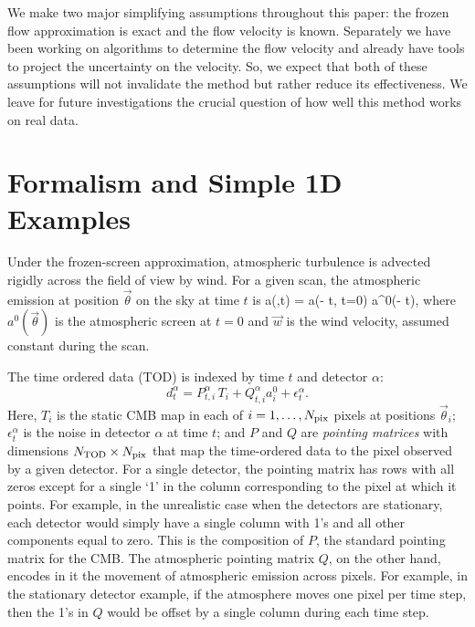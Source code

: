 We make two major simplifying assumptions throughout this paper: the frozen flow approximation is exact and the flow velocity is known. Separately we have been working on algorithms to determine the flow velocity and already have tools to project the uncertainty on the velocity. So, we expect that both of these assumptions will not invalidate the method but rather reduce its effectiveness. We leave for future investigations the crucial question of how well this method works on real data.



\section{Formalism and Simple 1D Examples}

Under the frozen-screen approximation, atmospheric turbulence is advected rigidly across the field of view by wind. For a given scan, the atmospheric emission at position $\vec\theta$ on the sky at time $t$ is \be
a(\vec\theta,t) = a(\vec\theta -  t, t=0) \equiv a^0(\vec\theta -  t),\ee 
where $a^0(\vec\theta)$ is the atmospheric screen at $t=0$ and $\vec{w}$ is the wind velocity, assumed constant during the scan. 

The time ordered data (TOD) is indexed by time $t$ and detector $\alpha$:
\begin{equation}
{d}^\alpha_{t} = P^{\alpha}_{t,i}\,T_i + Q^\alpha_{t,i} a^0_{i} + \epsilon^\alpha_{t}.
\end{equation}
Here, $T_i$ is the static CMB map in each of $i=1,\ldots, N_{\rm pix}$ pixels at positions $\vec\theta_i$; $\epsilon^\alpha_t$ is the noise in detector $\alpha$ at time $t$; and $P$ and $Q$ are {\it pointing matrices} with dimensions $N_{\rm TOD} \times N_{\rm pix}$ that map the time-ordered data to the pixel observed by a given detector. For a single detector, the pointing matrix has rows with all zeros except for a single `1' in the column corresponding to the pixel at which it points. For example, in the unrealistic case when the detectors are stationary, each detector would simply have a single column with 1's and all other components equal to zero. This is the composition of $P$, the standard pointing matrix for the CMB. The atmospheric pointing matrix $Q$, on the other hand, encodes in it the movement of atmospheric emission across pixels. For example, in the stationary detector example, if the atmosphere moves one pixel per time step, then the 1's in $Q$ would be offset by a single column during each time step.

